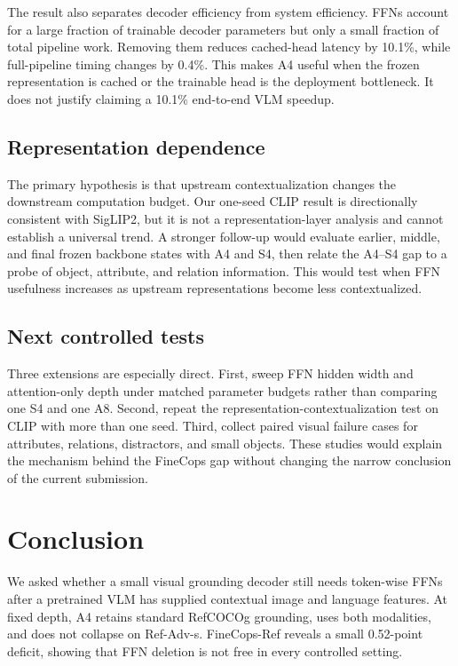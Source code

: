 \documentclass[conference]{IEEEtran}
\begin{document}
The result also separates decoder efficiency from system efficiency. FFNs account for a large fraction of trainable decoder parameters but only a small fraction of total pipeline work. Removing them reduces cached-head latency by 10.1\%, while full-pipeline timing changes by 0.4\%. This makes A4 useful when the frozen representation is cached or the trainable head is the deployment bottleneck. It does not justify claiming a 10.1\% end-to-end VLM speedup.

\subsection{Representation dependence}
The primary hypothesis is that upstream contextualization changes the downstream computation budget. Our one-seed CLIP result is directionally consistent with SigLIP2, but it is not a representation-layer analysis and cannot establish a universal trend. A stronger follow-up would evaluate earlier, middle, and final frozen backbone states with A4 and S4, then relate the A4--S4 gap to a probe of object, attribute, and relation information. This would test when FFN usefulness increases as upstream representations become less contextualized.

\subsection{Next controlled tests}
Three extensions are especially direct. First, sweep FFN hidden width and attention-only depth under matched parameter budgets rather than comparing one S4 and one A8. Second, repeat the representation-contextualization test on CLIP with more than one seed. Third, collect paired visual failure cases for attributes, relations, distractors, and small objects. These studies would explain the mechanism behind the FineCops gap without changing the narrow conclusion of the current submission.

\section{Conclusion}
We asked whether a small visual grounding decoder still needs token-wise FFNs after a pretrained VLM has supplied contextual image and language features. At fixed depth, A4 retains standard RefCOCOg grounding, uses both modalities, and does not collapse on Ref-Adv-s. FineCops-Ref reveals a small 0.52-point deficit, showing that FFN deletion is not free in every controlled setting.
\end{document}

